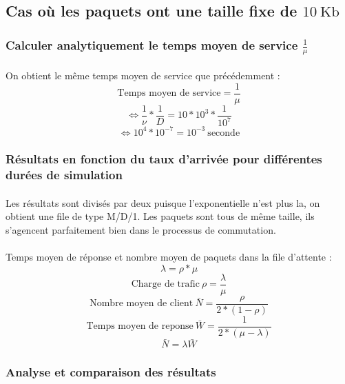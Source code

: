         \subsection{Cas où les paquets ont une taille fixe de $10 \ \text{Kb}$}
%
            \subsubsection{Calculer analytiquement le temps moyen de service $\frac{1}{\mu}$}
%
                \paragraph{}
On obtient le même temps moyen de service que précédemment :
%
                \[  \text{Temps moyen de service} = \frac{1}{\mu} \]
                \[ \iff \frac{1}{\nu} * \frac{1}{D} = 10 * 10^{3} * \frac{1}{10^{7}} \]
                \[ \iff 10^{4} * 10^{-7} = 10^{-3} \ \text{seconde} \]
%
%
            \subsubsection{Résultats en fonction du taux d'arrivée pour différentes durées de simulation}
%
                \paragraph{}
Les résultats sont divisés par deux puisque l'exponentielle n'est plus la, on obtient une file de type M/D/1.
Les paquets sont tous de même taille, ils s'agencent parfaitement bien dans le processus de commutation.
%
                \paragraph{}
Temps moyen de réponse et nombre moyen de paquets dans la file d'attente :
%
            \[  \lambda = \rho * \mu \]
            \[  \text{Charge de trafic} \ \rho = \frac{\lambda}{\mu} \]
            \[  \text{Nombre moyen de client} \ \bar{N} = \frac{\rho}{2 * (1 - \rho)} \]
            \[  \text{Temps moyen de reponse} \ \bar{W} = \frac{1}{2 * (\mu - \lambda)} \]
            \[  \bar{N} = \lambda \bar{W} \]
%
%
            \subsubsection{Analyse et comparaison des résultats}
%
